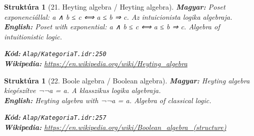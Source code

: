 \documentclass[11pt,a4paper,twocolumn]{article}
\newtheorem{struktura}[tetel]{Struktúra}
\begin{document}
\begin{struktura}[21. Heyting algebra / Heyting algebra]

\textbf{Magyar:} Poset exponenciállal: a ∧ b ≤ c ⟺ a ≤ b ⇒ c. Az intuicionista logika algebraja.\\

\textbf{English:} Poset with exponential: a ∧ b ≤ c ⟺ a ≤ b ⇒ c. Algebra of intuitionistic logic.\\

\begin{center}
\end{center}

\textbf{Kód:} \texttt{Alap/KategoriaT.idr:250}\\
\textbf{Wikipedia:} \url{https://en.wikipedia.org/wiki/Heyting_algebra}

\end{struktura}

\vspace{0.5cm}

\begin{struktura}[22. Boole algebra / Boolean algebra]

\textbf{Magyar:} Heyting algebra kiegészítve ¬¬a = a. A klasszikus logika algebraja.\\

\textbf{English:} Heyting algebra with ¬¬a = a. Algebra of classical logic.\\

\begin{center}
\end{center}

\textbf{Kód:} \texttt{Alap/KategoriaT.idr:257}\\
\textbf{Wikipedia:} \url{https://en.wikipedia.org/wiki/Boolean_algebra_(structure)}

\end{struktura}

\vspace{0.5cm}
\end{document}
